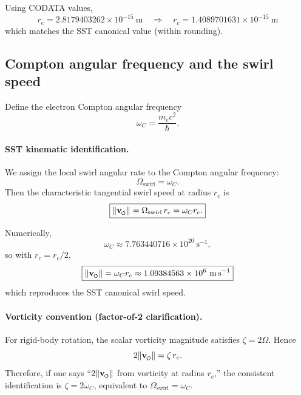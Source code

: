 \documentclass[11pt]{article}
\newcommand{\vswirl}{\mathbf{v}_{\mkern-2mu\scriptscriptstyle\boldsymbol{\circlearrowleft}}}
\newcommand{\rc}{r_c}                                    %
\begin{document}
            Using CODATA values,
            \[
                r_e = 2.8179403262\times 10^{-15}\ \mathrm{m}
                \quad\Rightarrow\quad
                \boxed{\rc = 1.4089701631\times 10^{-15}\ \mathrm{m}}
            \]
            which matches the SST canonical value (within rounding).

    \subsection{Compton angular frequency and the swirl speed}
    Define the electron Compton angular frequency
    \begin{equation}
        \omega_C = \frac{m_e c^2}{\hbar}.
        \label{eq:omegaC}
    \end{equation}

    \paragraph{SST kinematic identification.}
        We assign the local swirl angular rate to the Compton angular frequency:
        \begin{equation}
            \Omega_{\text{swirl}}=\omega_C.
            \label{eq:OmegaSwirl-omegaC}
        \end{equation}
        Then the characteristic tangential swirl speed at radius \(\rc\) is
        \begin{equation}
            \boxed{\lVert \vswirl\rVert = \Omega_{\text{swirl}}\,\rc = \omega_C \rc.}
            \label{eq:vswirl-from-omegaC-rc}
        \end{equation}

        Numerically,
        \[
            \omega_C \approx 7.763440716\times 10^{20}\ \mathrm{s^{-1}},
        \]
        so with \(\rc=r_e/2\),
        \[
            \boxed{
                \lVert \vswirl\rVert
                = \omega_C \rc
                \approx 1.09384563\times 10^6\ \mathrm{m\,s^{-1}}
            }
        \]
        which reproduces the SST canonical swirl speed.

    \paragraph{Vorticity convention (factor-of-2 clarification).}
        For rigid-body rotation, the scalar vorticity magnitude satisfies \(\zeta=2\Omega\). Hence
        \begin{equation}
            2\lVert \vswirl\rVert = \zeta\,\rc.
            \label{eq:vorticity-convention}
        \end{equation}
        Therefore, if one says ``\(2\lVert \vswirl\rVert\) from vorticity at radius \(\rc\),''
        the consistent identification is \(\zeta=2\omega_C\), equivalent to \(\Omega_{\text{swirl}}=\omega_C\).
\end{document}
